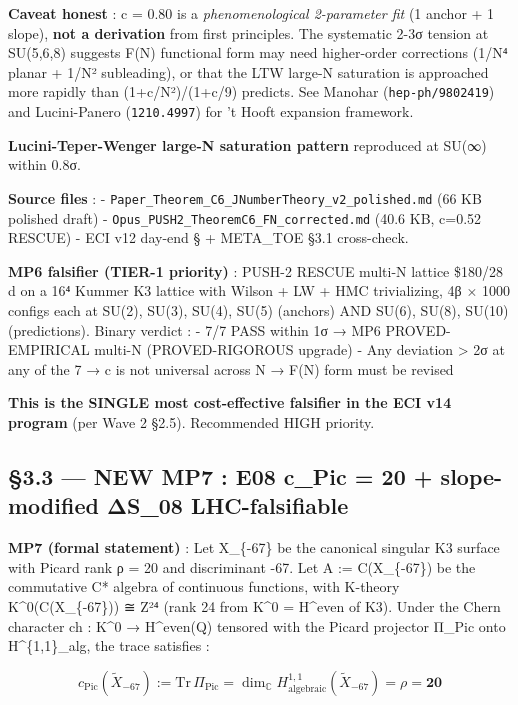 \documentclass[
  11pt,
  a4paper,
]{article}
\begin{document}
\textbf{Caveat honest} : c = 0.80 is a \emph{phenomenological 2-parameter fit} (1 anchor + 1 slope), \textbf{not a derivation} from first principles. The systematic 2-3σ tension at SU(5,6,8) suggests F(N) functional form may need higher-order corrections (1/N⁴ planar + 1/N² subleading), or that the LTW large-N saturation is approached more rapidly than (1+c/N²)/(1+c/9) predicts. See Manohar (\texttt{hep-ph/9802419}) and Lucini-Panero (\texttt{1210.4997}) for 't Hooft expansion framework.

\textbf{Lucini-Teper-Wenger large-N saturation pattern} reproduced at SU(∞) within 0.8σ.

\textbf{Source files} :
- \texttt{Paper\_Theorem\_C6\_JNumberTheory\_v2\_polished.md} (66 KB polished draft)
- \texttt{Opus\_PUSH2\_TheoremC6\_FN\_corrected.md} (40.6 KB, c=0.52 RESCUE)
- ECI v12 day-end § + META\_TOE §3.1 cross-check.

\textbf{MP6 falsifier (TIER-1 priority)} : PUSH-2 RESCUE multi-N lattice \$180/28 d on a 16⁴ Kummer K3 lattice with Wilson + LW + HMC trivializing, 4β × 1000 configs each at SU(2), SU(3), SU(4), SU(5) (anchors) AND SU(6), SU(8), SU(10) (predictions). Binary verdict :
- 7/7 PASS within 1σ → MP6 PROVED-EMPIRICAL multi-N (PROVED-RIGOROUS upgrade)
- Any deviation \textgreater{} 2σ at any of the 7 → c is not universal across N → F(N) form must be revised

\textbf{This is the SINGLE most cost-effective falsifier in the ECI v14 program} (per Wave 2 §2.5). Recommended HIGH priority.

\hypertarget{new-mp7-e08-c_pic-20-slope-modified-ux3b4s_08-lhc-falsifiable}{%
\subsection{§3.3 --- NEW MP7 : E08 c\_Pic = 20 + slope-modified ΔS\_08 LHC-falsifiable}\label{new-mp7-e08-c_pic-20-slope-modified-ux3b4s_08-lhc-falsifiable}}

\textbf{MP7 (formal statement)} : Let X\_\{-67\} be the canonical singular K3 surface with Picard rank ρ = 20 and discriminant -67. Let A := C(X\_\{-67\}) be the commutative C* algebra of continuous functions, with K-theory K\^{}0(C(X\_\{-67\})) ≅ Z²⁴ (rank 24 from K\^{}0 = H\^{}even of K3). Under the Chern character ch : K\^{}0 → H\^{}even(Q) tensored with the Picard projector Π\_Pic onto H\^{}\{1,1\}\_alg, the trace satisfies :

\[
c_{\text{Pic}}(\tilde X_{-67}) := \text{Tr}\, \Pi_{\text{Pic}} = \dim_{\mathbb{C}} H^{1,1}_{\text{algebraic}}(\tilde X_{-67}) = \rho = \mathbf{20}
\]
\end{document}

